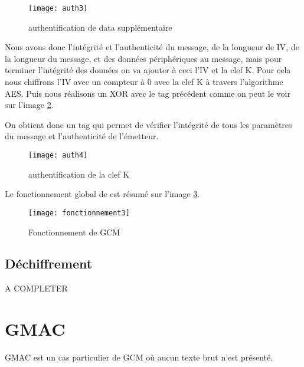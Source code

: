\begin{figure}[!h]
  \centering
  \texttt{[image: auth3]}
  \caption{authentification de data supplémentaire}
  \label{auth3}
\end{figure}



Nous avons donc l'intégrité et l'authenticité du message, de la longueur de IV, de la longueur du message, et des données périphériques au message, mais pour terminer l'intégrité des données on va ajouter à ceci l'IV et la clef K. %
Pour cela nous chiffrons l'IV avec un compteur à 0 avec la clef K à travers l'algorithme AES. Puis nous réalisons un XOR avec le tag précédent comme on peut le voir sur l'image \ref{auth4}.

On obtient donc un tag qui permet de vérifier l'intégrité de tous les paramètres du message et l'authenticité de l'émetteur.

\begin{figure}[!h]
  \centering
  \texttt{[image: auth4]}
  \caption{authentification de la clef K}
  \label{auth4}
\end{figure}


Le fonctionnement global de \aes est résumé sur l'image \ref{Fonctionnement de GCM}.


\begin{figure}[!h]
  \centering
  \texttt{[image: fonctionnement3]}
  \caption{Fonctionnement de GCM}
  \label{Fonctionnement de GCM}
\end{figure}


\subsection{Déchiffrement}

A COMPLETER


\section{GMAC}

GMAC est un cas particulier de GCM où aucun texte brut n'est présenté.




